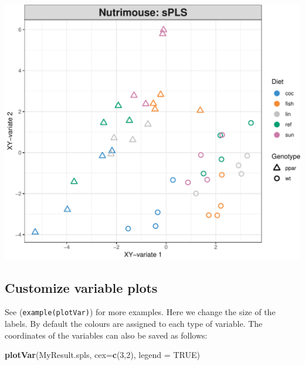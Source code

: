 \documentclass[]{book}
\newenvironment{Shaded}{\begin{snugshade}}{\end{snugshade}}
\newcommand{\DataTypeTok}[1]{\textcolor[rgb]{0.13,0.29,0.53}{#1}}
\newcommand{\DecValTok}[1]{\textcolor[rgb]{0.00,0.00,0.81}{#1}}
\newcommand{\KeywordTok}[1]{\textcolor[rgb]{0.13,0.29,0.53}{\textbf{#1}}}
\newcommand{\NormalTok}[1]{#1}
\newcommand{\OperatorTok}[1]{\textcolor[rgb]{0.81,0.36,0.00}{\textbf{#1}}}
\newcommand{\OtherTok}[1]{\textcolor[rgb]{0.56,0.35,0.01}{#1}}
\newcommand{\StringTok}[1]{\textcolor[rgb]{0.31,0.60,0.02}{#1}}
\begin{document}
\begin{Shaded}
\end{Shaded}

\begin{center}\includegraphics[width=0.5\linewidth,]{Figures/05-pls-plotIndiv-2-1} \end{center}

\hypertarget{pls:plotVar}{%
\subsection{Customize variable plots}\label{pls:plotVar}}

See (\texttt{example(plotVar)}) for more examples. Here we change the size of the labels. By default the colours are assigned to each type of variable. The coordinates of the variables can also be saved as follows:

\begin{Shaded}
\begin{Highlighting}[]
\KeywordTok{plotVar}\NormalTok{(MyResult.spls, }\DataTypeTok{cex=}\KeywordTok{c}\NormalTok{(}\DecValTok{3}\NormalTok{,}\DecValTok{2}\NormalTok{), }\DataTypeTok{legend =} \OtherTok{TRUE}\NormalTok{)}
\end{Highlighting}
\end{Shaded}
\end{document}
